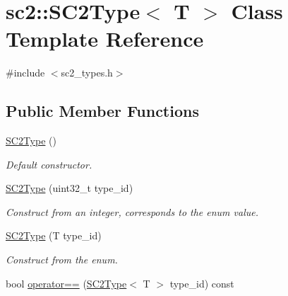\hypertarget{classsc2_1_1_s_c2_type}{}\section{sc2\+:\+:S\+C2\+Type$<$ T $>$ Class Template Reference}
\label{classsc2_1_1_s_c2_type}


{\ttfamily \#include $<$sc2\+\_\+types.\+h$>$}

\subsection*{Public Member Functions}
\begin{DoxyCompactItemize}
\item 
\mbox{\label{classsc2_1_1_s_c2_type_a797ecedf348b295b1827f6cd875843e7}} 
\hyperlink{classsc2_1_1_s_c2_type_a797ecedf348b295b1827f6cd875843e7}{S\+C2\+Type} ()
\begin{DoxyCompactList}\small\item\em Default constructor. \end{DoxyCompactList}\item 
\mbox{\label{classsc2_1_1_s_c2_type_adda8c2ecd47bf1fe93ad54726404674f}} 
\hyperlink{classsc2_1_1_s_c2_type_adda8c2ecd47bf1fe93ad54726404674f}{S\+C2\+Type} (uint32\+\_\+t type\+\_\+id)
\begin{DoxyCompactList}\small\item\em Construct from an integer, corresponds to the enum value. \end{DoxyCompactList}\item 
\mbox{\label{classsc2_1_1_s_c2_type_ac956d32e3d7989b2e0ab2664c9822d16}} 
\hyperlink{classsc2_1_1_s_c2_type_ac956d32e3d7989b2e0ab2664c9822d16}{S\+C2\+Type} (T type\+\_\+id)
\begin{DoxyCompactList}\small\item\em Construct from the enum. \end{DoxyCompactList}\item 
bool \hyperlink{classsc2_1_1_s_c2_type_a499b06e107c0561ce3d2d80094fbdd94}{operator==} (\hyperlink{classsc2_1_1_s_c2_type}{S\+C2\+Type}$<$ T $>$ type\+\_\+id) const
\item 
\mbox{\label{classsc2_1_1_s_c2_type_a404a385de418d89ea84344d9ac7fd728}} 

\end{DoxyCompactItemize}
